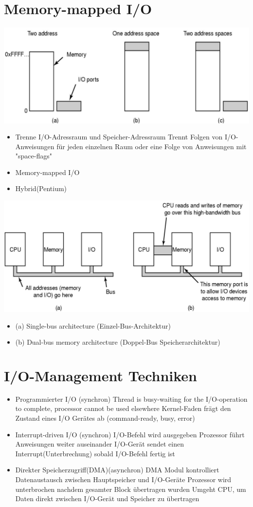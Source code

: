 \documentclass[a4paper]{scrreprt}
\begin{document}
\section{Memory-mapped I/O}
\includegraphics[scale=0.5]{graphics/chapter9_2.png}
\begin{itemize}
	\item Trenne I/O-Adressraum und Speicher-Adressraum
		\subitem Trennt Folgen von I/O-Anweisungen für jeden einzelnen Raum
		\subitem oder eine Folge von Anweisungen mit "space-flags"
	\item Memory-mapped I/O
	\item Hybrid(Pentium)
\end{itemize}
\includegraphics[scale=0.25]{graphics/chapter9_3.png}
\begin{itemize}
\item (a) Single-bus architecture (Einzel-Bus-Architektur)
\item (b) Dual-bus memory architecture (Doppel-Bus Speicherarchitektur)
\end{itemize}
\section{I/O-Management Techniken}
\begin{itemize}
	\item Programmierter I/O (synchron)
		\subitem Thread is busy-waiting for the I/O-operation to complete, processor
cannot be used elsewhere
		\subitem Kernel-Faden frägt den Zustand eines I/O Gerätes ab (command-ready, busy, error)
	\item Interrupt-driven I/O (synchron)
		\subitem I/O-Befehl wird ausgegeben
		\subitem Prozessor führt Anweisungen weiter auseinander
		\subitem I/O-Gerät sendet einen Interrupt(Unterbrechung) sobald I/O-Befehl fertig ist
	\item Direkter Speicherzugriff(DMA)(asynchron)
		\subitem DMA Modul kontrolliert Datenaustausch zwischen Hauptspeicher und I/O-Geräte	\subitem Prozessor wird unterbrochen nachdem gesamter Block übertragen wurden	
		\subitem Umgeht CPU, um Daten direkt zwischen I/O-Gerät und Speicher zu übertragen
\end{itemize}
\end{document}
